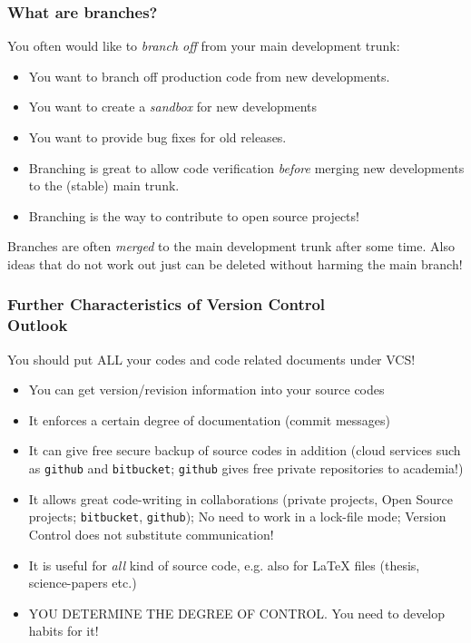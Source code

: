 \documentclass{beamer}
\newcommand{\github}{\texttt{github}\xspace}
\newcommand{\bitbucket}{\texttt{bitbucket}\xspace}
\begin{document}
%
\begin{frame}[fragile]
\frametitle{What are branches?}
\small
You often would like to \textit{branch off} from your main development
trunk:

\vspace{0.2cm}
\centerline{}
%
\begin{itemize}
\item You want to branch off production code from new developments.
\item You want to create a \textit{sandbox} for new developments
\item You want to provide bug fixes for old releases.
\item Branching is great to allow code verification \textit{before}
  merging new developments to the (stable) main trunk.
\item Branching is the way to contribute to open source projects!
\end{itemize}
Branches are often \emph{merged} to the main development trunk after
some time. Also ideas that do not work out just can be deleted without
harming the main branch!
\end{frame}
%
\begin{frame}
\frametitle{Further Characteristics of Version Control \\ Outlook}
%
\small
\alert{You should put ALL your codes and code related documents under VCS!}
\begin{itemize}
\item You can get version/revision information into your source codes
\item It enforces a certain degree of documentation (commit messages)
\item It can give free secure backup of source codes in addition (cloud services
  such as \github and \bitbucket; \github gives free private repositories
  to academia!)
\item It allows great code-writing in collaborations (private
  projects, Open Source projects; \bitbucket, \github); \alert{No need to work
  in a lock-file mode}; Version Control
  does not substitute communication!
\item It is useful for \emph{all} kind of source code, e.g. also for
  \LaTeX{} files (thesis, science-papers etc.)
\item {\color{red} YOU DETERMINE THE DEGREE OF CONTROL}. You need to
  develop habits for it!
\end{itemize}
\end{frame}
%
\end{document}
